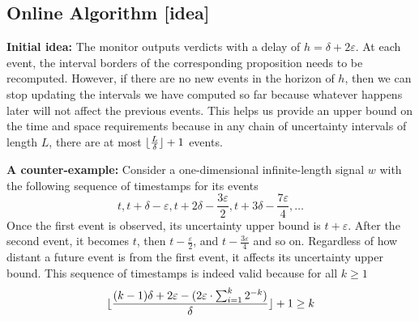 \documentclass[envcountsame, runningheads]{llncs}
\newcommand{\?}{\text{?}}
\DeclarePairedDelimiter\floor{\lfloor}{\rfloor}
\begin{document}
	
	\subsection*{Online Algorithm [idea]}
	\textbf{Initial idea:}
	The monitor outputs verdicts with a delay of $h = \delta + 2\varepsilon$.
	At each event, the interval borders of the corresponding proposition needs to be recomputed.
	However, if there are no new events in the horizon of $h$, then we can stop updating the intervals we have computed so far because whatever happens later will not affect the previous events.
	This helps us provide an upper bound on the time and space requirements because in any chain of uncertainty intervals of length $L$, there are at most $\floor{\frac{L}{\delta}} + 1$ events.
	
	\vspace{1em}
	\noindent
	\textbf{A counter-example:} Consider a one-dimensional infinite-length signal $w$ with the following sequence of timestamps for its events
	$$ t, t + \delta - \varepsilon, t + 2\delta - \frac{3\varepsilon}{2}, t + 3\delta - \frac{7\varepsilon}{4}, \ldots$$
	Once the first event is observed, its uncertainty upper bound is $t + \varepsilon$.
	After the second event, it becomes $t$, then $t - \frac{\varepsilon}{2}$, and $t - \frac{3\varepsilon}{4}$ and so on.
	Regardless of how distant a future event is from the first event, it affects its uncertainty upper bound.
	This sequence of timestamps is indeed valid because for all $k \geq 1$
	$$ \floor{\frac{(k-1)\delta + 2\varepsilon - (2\varepsilon \cdot \sum_{i=1}^{k}2^{-k})}{\delta}} + 1 \geq k $$

	
	\newpage
	
	
\end{document}

